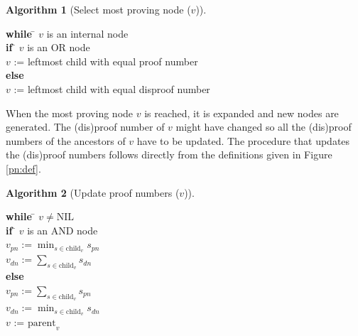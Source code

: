 \documentclass[a4paper, 11pt]{article}
\begin{document}
\begin{minipage}{\textwidth}
\vspace{4mm}
\theoremstyle{definition}
\newtheorem{algorithm}{Algorithm}
\begin{algorithm}[Select most proving node ($v$)]
\hfill\par
\begin{tabbing}
  \textbf{while} \= $v$ is an internal node \\
  \> \textbf{if} \= $v$ is an OR node\\
  \> \> $v$ := leftmost child with equal proof number\\
  \> \textbf{else} \\
  \> \> $v$ := leftmost child with equal disproof number
\end{tabbing}
\end{algorithm}
\vspace{4mm}
\end{minipage}

When the most proving node $v$ is reached, it is expanded and new nodes are generated. The (dis)proof number of $v$ might have
changed so all the (dis)proof numbers of the ancestors of $v$ have to be updated. The procedure that updates the (dis)proof numbers
follows directly from the definitions given in Figure \ref{pn:def}.

\begin{minipage}{\textwidth}
\vspace{4mm}
\begin{algorithm}[Update proof numbers ($v$)]
\label{alg:update}
\hfill\par
\begin{tabbing}
  \textbf{while} \= $v \not= \text{NIL}$\\
  \> \textbf{if} \= $v$ is an AND node\\
  \> \> $v_{pn} := \min_{s \in \text{child}_v} s_{pn}$\\
  \> \> $v_{dn} := \sum_{s \in \text{child}_v} s_{dn}$\\
  \> \textbf{else} \\
  \> \> $v_{pn} := \sum_{s \in \text{child}_v} s_{pn}$\\
  \> \> $v_{dn} := \min_{s \in \text{child}_v} s_{dn}$\\
  \> $v$ := $\text{parent}_v$
\end{tabbing}
\end{algorithm}
\vspace{4mm}
\end{minipage}
\end{document}
